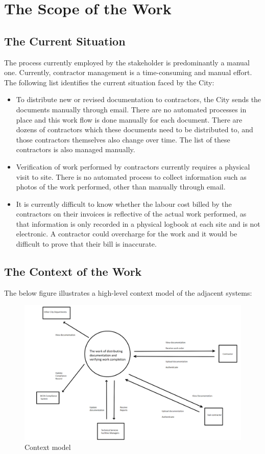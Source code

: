 \documentclass[12pt]{article}
\begin{document}
\section{The Scope of the Work}
\subsection{The Current Situation}
The process currently employed by the stakeholder is predominantly a manual one.
Currently, contractor management is a time-consuming and manual effort. The
following list identifies the current situation faced by the City:
\begin{itemize}
  \item To distribute new or revised documentation to contractors,
    the City sends the documents manually through email. There are no
    automated processes in place and this work flow is done manually
    for each document. There are dozens of contractors which these
    documents need to be distributed to, and those contractors
    themselves also change over time. The list of these contractors
    is also managed manually.
  \item Verification of work performed by contractors currently
    requires a physical visit to site. There is no automated process
    to collect information such as photos of the work performed,
    other than manually through email.
  \item It is currently difficult to know whether the labour cost
    billed by the contractors on their invoices is reflective of the
    actual work performed, as that information is only recorded in a
    physical logbook at each site and is not electronic. A contractor
    could overcharge for the work and it would be difficult to prove
    that their bill is inaccurate.

\end{itemize}

\subsection{The Context of the Work}
The below figure illustrates a high-level context model of the adjacent systems:
\begin{figure}[h]
  \centering
  \includegraphics[width=1\textwidth]{4G06A-context-model.png}
  \caption{Context model}
\end{figure}
\end{document}
